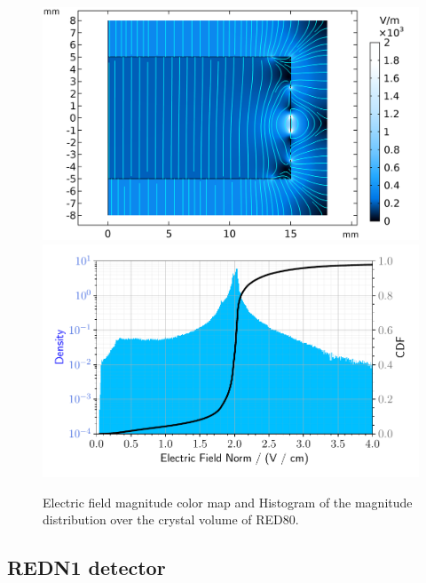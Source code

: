 \begin{figure}
\centering
\includegraphics[align=c, scale=0.5]{Figures/ElectrodesExperimental/efield_red80.png}
\includegraphics[align=c, scale=0.5]{Figures/ElectrodesExperimental/enorm_hist_red80.pdf}
\caption{Electric field magnitude color map and Histogram of the magnitude distribution over the crystal volume of RED80.}
\label{fig:efield-red80}
\end{figure}


\subsection{REDN1 detector}

